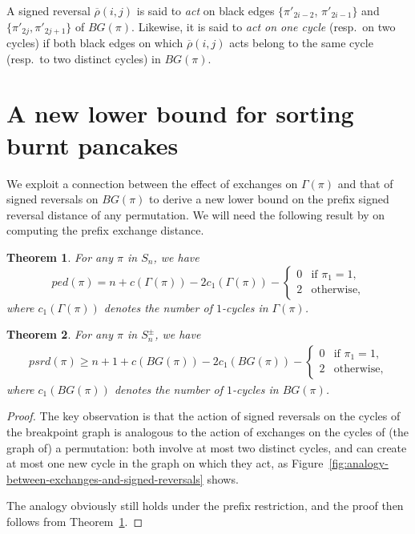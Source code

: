 \documentclass[review]{elsarticle}
\newtheorem{theorem}{Theorem}
\newcommand{\resp}{resp.\ }
\begin{document}
\begin{definition}
A signed reversal $\overline{\rho}(i,j)$ is said to \emph{act} on black edges $\{\pi'_{2i-2}$, $\pi'_{2i-1}\}$ and $\{\pi'_{2j},\pi'_{2j+1}\}$ of $BG(\pi)$. Likewise, it is said to \emph{act on one cycle} (\resp on two cycles) if both black edges on which $\overline{\rho}(i,j)$ acts belong to the same cycle (\resp to two distinct cycles) in $BG(\pi)$.
\end{definition}



\section{A new lower bound for sorting burnt pancakes}

We exploit a connection between the effect of exchanges on $\Gamma(\pi)$ and that of signed reversals on $BG(\pi)$ to derive a new lower bound on the prefix signed reversal distance of any permutation. We will need the following result by \citet{akers-star} on computing the prefix exchange distance.

\begin{theorem}\label{thm:formula-for-ped}
\cite{akers-star} For any $\pi$ in $S_n$, we have
$$ped(\pi)=
n+c(\Gamma(\pi))-2c_1(\Gamma(\pi))-\left\{
\begin{array}{ll}
0 & \mbox{if } \pi_1= 1, \\
2 & \mbox{otherwise},
\end{array}
\right.$$
where $c_1(\Gamma(\pi))$ denotes the number of $1$-cycles in $\Gamma(\pi)$.
\end{theorem}

\begin{theorem}\label{thm:lower-bound-on-psrd}
For any $\pi$ in $S^\pm_n$, we have
\begin{eqnarray}\label{eqn:lower-bound-on-psrd}
 psrd(\pi)\geq
n+1+c(BG(\pi))-2c_1(BG(\pi))-\left\{
\begin{array}{ll}
0 & \mbox{if } \pi_1= 1, \\
2 & \mbox{otherwise},
\end{array}
\right.
\end{eqnarray}
where $c_1(BG(\pi))$ denotes the number of $1$-cycles in $BG(\pi)$.
\end{theorem}
\begin{proof}
The key observation is that the action of signed reversals on the cycles of the breakpoint graph is analogous to the action of exchanges on the cycles of (the graph of) a permutation: both involve at most two distinct cycles, and can create at most one new cycle in the graph on which they act, as Figure~\ref{fig:analogy-between-exchanges-and-signed-reversals} shows. 



The analogy obviously still holds under the prefix restriction, and the proof then follows from Theorem~\ref{thm:formula-for-ped}.
\end{proof}
\end{document}
